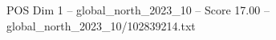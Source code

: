 \begin{textsample}{POS Dim 1 – global\_north\_2023\_10 – Score 17.00 – global\_north\_2023\_10/102839214.txt}
\end{textsample}

